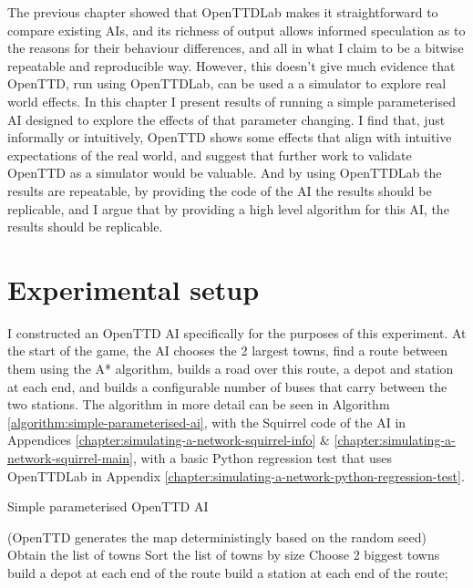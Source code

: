 \documentclass[logo,msc,dsti]{style/infthesis}    %
\begin{document}
{The previous chapter showed that OpenTTDLab makes it straightforward to compare existing AIs, and its richness of output allows informed speculation as to the reasons for their behaviour differences, and all in what I claim to be a bitwise repeatable and reproducible way. However, this doesn't give much evidence that OpenTTD, run using OpenTTDLab, can be used a a simulator to explore real world effects. In this chapter I present results of running a simple parameterised AI designed to explore the effects of that parameter changing. I find that, just informally or intuitively, OpenTTD shows some effects that align with intuitive expectations of the real world, and suggest that further work to validate OpenTTD as a simulator would be valuable. And by using OpenTTDLab the results are repeatable, by providing the code of the AI the results should be replicable, and I argue that by providing a high level algorithm for this AI, the results should be replicable.

\section{Experimental setup}

I constructed an OpenTTD AI specifically for the purposes of this experiment. At the start of the game, the AI chooses the 2 largest towns, find a route between them using the A* algorithm, builds a road over this route, a depot and station at each end, and builds a configurable number of buses that carry between the two stations. The algorithm in more detail can be seen in Algorithm \ref{algorithm:simple-parameterised-ai}, with the Squirrel code of the AI in Appendices \ref{chapter:simulating-a-network-squirrel-info} \& \ref{chapter:simulating-a-network-squirrel-main}, with a basic Python regression test that uses OpenTTDLab in Appendix \ref{chapter:simulating-a-network-python-regression-test}.

\begin{algorithm}
\caption{Simple parameterised OpenTTD AI}
\label{algorithm:simple-parameterised-ai}
 (OpenTTD generates the map deterministingly based on the random seed) \;
 Obtain the list of towns \;
 Sort the list of towns by size \;
 Choose 2 biggest towns \;
 build a depot at each end of the route\;
 build a station at each end of the route;
\end{algorithm}

}
\end{document}
